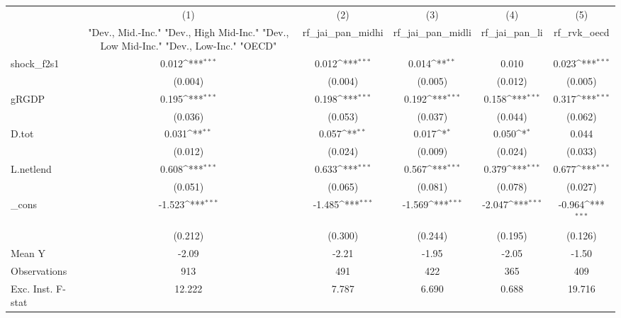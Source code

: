 {
\def\sym#1{\ifmmode^{#1}\else\(^{#1}\)\fi}
\begin{tabular}{l*{5}{c}}
\toprule
            &\multicolumn{1}{c}{(1)}&\multicolumn{1}{c}{(2)}&\multicolumn{1}{c}{(3)}&\multicolumn{1}{c}{(4)}&\multicolumn{1}{c}{(5)}\\
            &\multicolumn{1}{c}{ "Dev., Mid.-Inc." "Dev., High Mid-Inc." "Dev., Low Mid-Inc." "Dev., Low-Inc." "OECD" }&\multicolumn{1}{c}{rf\_jai\_pan\_midhi}&\multicolumn{1}{c}{rf\_jai\_pan\_midli}&\multicolumn{1}{c}{rf\_jai\_pan\_li}&\multicolumn{1}{c}{rf\_rvk\_oecd}\\
\midrule
shock\_f2s1  &       0.012\sym{***}&       0.012\sym{***}&       0.014\sym{**} &       0.010         &       0.023\sym{***}\\
            &     (0.004)         &     (0.004)         &     (0.005)         &     (0.012)         &     (0.005)         \\
\addlinespace
gRGDP       &       0.195\sym{***}&       0.198\sym{***}&       0.192\sym{***}&       0.158\sym{***}&       0.317\sym{***}\\
            &     (0.036)         &     (0.053)         &     (0.037)         &     (0.044)         &     (0.062)         \\
\addlinespace
D.tot       &       0.031\sym{**} &       0.057\sym{**} &       0.017\sym{*}  &       0.050\sym{*}  &       0.044         \\
            &     (0.012)         &     (0.024)         &     (0.009)         &     (0.024)         &     (0.033)         \\
\addlinespace
L.netlend   &       0.608\sym{***}&       0.633\sym{***}&       0.567\sym{***}&       0.379\sym{***}&       0.677\sym{***}\\
            &     (0.051)         &     (0.065)         &     (0.081)         &     (0.078)         &     (0.027)         \\
\addlinespace
\_cons      &      -1.523\sym{***}&      -1.485\sym{***}&      -1.569\sym{***}&      -2.047\sym{***}&      -0.964\sym{***}\\
            &     (0.212)         &     (0.300)         &     (0.244)         &     (0.195)         &     (0.126)         \\
\midrule
Mean Y      &       -2.09         &       -2.21         &       -1.95         &       -2.05         &       -1.50         \\
Observations&         913         &         491         &         422         &         365         &         409         \\
Exc. Inst. F-stat&      12.222         &       7.787         &       6.690         &       0.688         &      19.716         \\
\bottomrule
\end{tabular}
}
